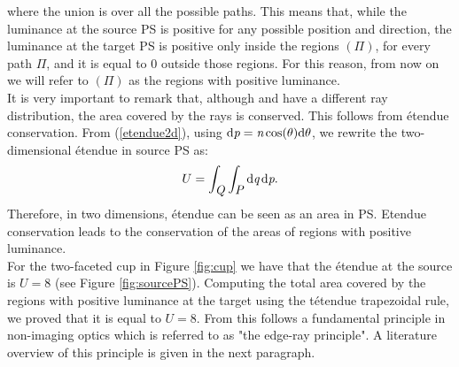where the union is over all the possible paths.
This means that, while the luminance at the source PS is positive for any possible position and direction, the luminance at the target PS is positive only inside the regions $(\Pi)$, for every path $\Pi$, and it is equal to $0$ outside those regions. For this reason, from now on we will refer to $(\Pi)$ as the regions with positive luminance. \\ \indent
It is very important to remark that, although  and  have a different ray distribution, the area covered by the rays is conserved. This follows from \'{e}tendue conservation. From (\ref{etendue2d}), using $\textrm{d}\textit{p}= \textit{n}\cos(\theta)\textrm{d}\theta$, we rewrite the two-dimensional \'{e}tendue in source PS as:
\begin{equation}
U = \int_{\mbox{$\emph{Q}_{\textit{}}$}}\int_{\mbox{$\emph{P}_{\textit{}}$}} \textrm{d}\textit{q}\,\textrm{d}\textit{p}.
\end{equation}
Therefore, in two dimensions, \'{e}tendue can be seen as an area in PS. Etendue conservation leads to the conservation of the areas of regions with positive luminance.\\ \indent
For the two-faceted cup in Figure \ref{fig:cup} we have that the \'{e}tendue at the source is $U=8$ (see Figure \ref{fig:sourcePS}). Computing the total area covered by the regions with positive luminance at the target using the t\'{e}tendue trapezoidal rule, we proved that it is equal to $U=8$. 
From this follows a fundamental principle in non-imaging optics which is referred to as "the edge-ray principle". A literature overview of this principle is given in the next paragraph.
